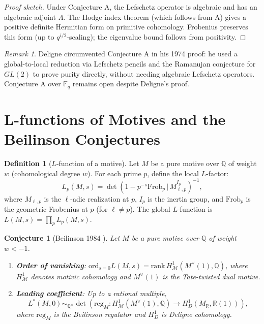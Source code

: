\documentclass[12pt]{article}
\newtheorem{conjecture}[theorem]{Conjecture}
\theoremstyle{definition}
\newtheorem{definition}[theorem]{Definition}
\theoremstyle{remark}
\newtheorem{remark}[theorem]{Remark}
\begin{document}
\begin{proof}[Proof sketch]
Under Conjecture A, the Lefschetz operator is algebraic and has an algebraic
adjoint $\Lambda$. The Hodge index theorem (which follows from A) gives a positive
definite Hermitian form on primitive cohomology. Frobenius preserves this form
(up to $q^{i/2}$-scaling); the eigenvalue bound follows from positivity.
\end{proof}

\begin{remark}
Deligne circumvented Conjecture A in his 1974 proof: he used a global-to-local
reduction via Lefschetz pencils and the Ramanujan conjecture for $GL(2)$ to prove
purity directly, without needing algebraic Lefschetz operators. Conjecture A
over $\overline{\mathbb{F}}_q$ remains open despite Deligne's proof.
\end{remark}

\section{L-functions of Motives and the Beilinson Conjectures}

\begin{definition}[$L$-function of a motive]
Let $M$ be a pure motive over $\mathbb{Q}$ of weight $w$ (cohomological degree $w$).
For each prime $p$, define the local $L$-factor:
\[
L_p(M,s) = \det\!\left(1 - p^{-s}\mathrm{Frob}_p\,\Big|\,M_{\ell,p}^{I_p}\right)^{-1},
\]
where $M_{\ell,p}$ is the $\ell$-adic realization at $p$, $I_p$ is the inertia group,
and $\mathrm{Frob}_p$ is the geometric Frobenius at $p$ (for $\ell\neq p$).
The global $L$-function is $L(M,s) = \prod_p L_p(M,s)$.
\end{definition}

\begin{conjecture}[Beilinson 1984 \cite{beilinson1984}]\label{conj:beilinson}
Let $M$ be a pure motive over $\mathbb{Q}$ of weight $w < -1$.
\begin{enumerate}
\item \textbf{Order of vanishing}: $\mathrm{ord}_{s=0}L(M,s) =
  \mathrm{rank}\,H^1_{\mathcal{M}}(M^\vee(1),\mathbb{Q})$,
  where $H^1_{\mathcal{M}}$ denotes motivic cohomology and $M^\vee(1)$ is
  the Tate-twisted dual motive.
\item \textbf{Leading coefficient}: Up to a rational multiple,
  \[
  L^*(M,0) \sim_{\mathbb{Q}^\times}
  \det\!\left(\mathrm{reg}_M: H^1_{\mathcal{M}}(M^\vee(1),\mathbb{Q})\to
    H^1_D(M_\mathbb{R},\mathbb{R}(1))\right),
  \]
  where $\mathrm{reg}_M$ is the Beilinson regulator and $H^1_D$ is Deligne cohomology.
\end{enumerate}
\end{conjecture}
\end{document}
